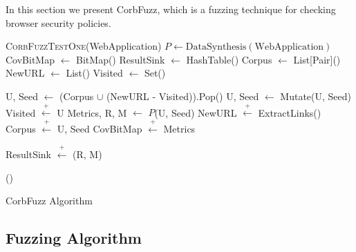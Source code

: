 \documentclass[10pt,conference]{IEEEtran}
\begin{document}
In this section we present CorbFuzz, which is a fuzzing technique for
checking browser security policies. %
%



\label{proc:corbfuzz-imp}
\begin{algorithm}
\begin{algorithmic}[1]


        \State \textsc{CorbFuzzTestOne}(WebApplication)
    \EndFor
\EndProcedure
{}
    \State $P \leftarrow \text{DataSynthesis}(\text{WebApplication})$
    \State CovBitMap $\leftarrow$ BitMap() 
    \State ResultSink $\leftarrow$ HashTable() 
    \State Corpus $\leftarrow$ List[Pair]() 
    \State NewURL $\leftarrow$ List()
    \State Visited $\leftarrow$ Set()

        \State U, Seed $\leftarrow$ (Corpus $\cup$ (NewURL - Visited)).Pop()
        \State U, Seed $\leftarrow$ Mutate(U, Seed)
        \State Visited $\overset{+}{\leftarrow}$ U
        \State Metrics, R, M $\leftarrow$ $P$(U, Seed) 
        \State NewURL $\overset{+}{\leftarrow}$ ExtractLinks()
            \State Corpus $\overset{+}{\leftarrow}$ U, Seed
            \State CovBitMap $\overset{+}{\leftarrow}$ Metrics
        \EndIf

                    \State ResultSink $\overset{+}{\leftarrow}$ (R, M)
                    \EndIf

    \EndFor
    \State {}()
\EndProcedure

\end{algorithmic}
    \caption{CorbFuzz Algorithm} %
\end{algorithm}

\subsection{Fuzzing Algorithm}
\end{document}
